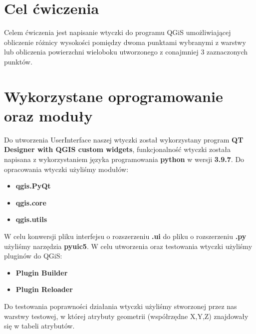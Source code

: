 \documentclass[a4paper,titleauthor]{mwart}
\begin{document}
\section{Cel ćwiczenia} 
	Celem ćwiczenia jest napisanie wtyczki do programu QGiS umożliwiającej obliczenie różnicy wysokości pomiędzy dwoma punktami wybranymi z warstwy lub obliczenia powierzchni wieloboku utworzonego z conajmniej 3 zaznaczonych punktów. 
\section{Wykorzystane oprogramowanie oraz moduły}
Do utworzenia UserInterface naszej wtyczki został wykorzystany program \textbf{QT Designer with QGIS custom widgets}, funkcjonalność wtyczki została napisana z wykorzystaniem języka programowania \textbf{python} w wersji \textbf{3.9.7}. Do opracowania wtyczki użyliśmy modułów:
\begin{itemize}
	\item \textbf{qgis.PyQt}
	\item \textbf{qgis.core}
	\item \textbf{qgis.utils}
\end{itemize}
W celu konwersji pliku interfejsu o rozszerzeniu \textbf{.ui} do pliku o rozszerzeniu \textbf{.py} użyliśmy narzędzia \textbf{pyuic5}. W celu utworzenia oraz testowania wtyczki użyliśmy pluginów do QGiS:
\begin{itemize}
	\item \textbf{Plugin Builder}
	\item \textbf{Plugin Reloader}
\end{itemize}
Do testowania poprawności działania wtyczki użyliśmy stworzonej przez nas warstwy testowej, w której atrybuty geometrii (współrzędne X,Y,Z) znajdowały się w tabeli atrybutów.
\end{document}
